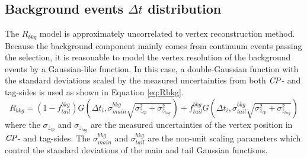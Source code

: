 \subsection{Background events $\Delta t$ distribution}
The $R_{bkg}$ model is approximately uncorrelated to vertex reconstruction method. Because the background component mainly comes from continuum events passing the selection, it is reasonable to model the vertex resolution of the background events by a Gaussian-like function. In this case, a double-Gaussian function with the standard deviations scaled by the measured uncertainties from both $\it{CP}$- and tag-sides is used as shown in Equation \ref{eq:Rbkg}. 
\begin{equation}\label{eq:Rbkg}
R_{bkg} = (1-f^{bkg}_{tail})G(\Delta t_i, \sigma^{bkg}_{main}\sqrt{\sigma^2_{z_{cp}}+\sigma^2_{z_{tag}}})
+ f^{bkg}_{tail}G(\Delta t_i, \sigma^{bkg}_{tail}\sqrt{\sigma^2_{z_{cp}}+\sigma^2_{z_{tag}}})
\end{equation}
where the $\sigma_{z_{cp}}$ and $\sigma_{z_{tag}}$ are the measured uncertainties of the vertex position in $\it{CP}$- and tag-sides. The $\sigma_{main}^{bkg}$ and $\sigma_{tail}^{bkg}$ are the non-unit scaling parameters which control the standard deviations of the main and tail Gaussian functions.

